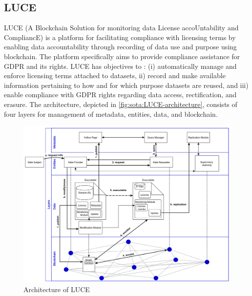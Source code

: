 \subsection*{LUCE}
LUCE \cite{havelange_luce_2019} (A Blockchain Solution for monitoring data License accoUntability and CompliancE) is a platform for facilitating compliance with licensing terms by enabling data accountability through recording of data use and purpose using blockchain. The platform specifically aims to provide compliance assistance for GDPR and its rights. LUCE has  objectives to : (i) automatically manage and enforce licensing terms attached to datasets, ii) record and make available information pertaining to how and for which purpose datasets are reused, and iii) enable compliance with GDPR rights regarding data access, rectification, and erasure. The architecture, depicted in \autoref{fig:sota:LUCE-architecture}, consists of four layers for management of metadata, entities, data, and blockchain. 
\begin{figure}[htbp]
    \centering
    \includegraphics[width=0.8\linewidth]{img/LUCE_architecture.png}
    \caption{Architecture of LUCE \cite{havelange_luce_2019}}
    \label{fig:sota:LUCE-architecture}
\end{figure}

